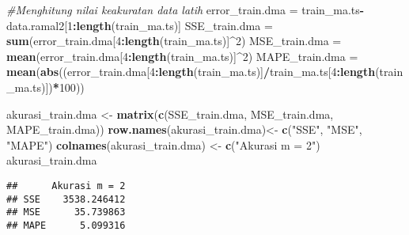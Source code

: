 \documentclass[
]{article}
\newenvironment{Shaded}{\begin{snugshade}}{\end{snugshade}}
\newcommand{\CommentTok}[1]{\textcolor[rgb]{0.56,0.35,0.01}{\textit{#1}}}
\newcommand{\DecValTok}[1]{\textcolor[rgb]{0.00,0.00,0.81}{#1}}
\newcommand{\FunctionTok}[1]{\textcolor[rgb]{0.13,0.29,0.53}{\textbf{#1}}}
\newcommand{\NormalTok}[1]{#1}
\newcommand{\OtherTok}[1]{\textcolor[rgb]{0.56,0.35,0.01}{#1}}
\newcommand{\SpecialCharTok}[1]{\textcolor[rgb]{0.81,0.36,0.00}{\textbf{#1}}}
\newcommand{\StringTok}[1]{\textcolor[rgb]{0.31,0.60,0.02}{#1}}
\begin{document}
\begin{Shaded}
\begin{Highlighting}[]
\CommentTok{\#Menghitung nilai keakuratan data latih}
\NormalTok{error\_train.dma }\OtherTok{=}\NormalTok{ train\_ma.ts}\SpecialCharTok{{-}}\NormalTok{data.ramal2[}\DecValTok{1}\SpecialCharTok{:}\FunctionTok{length}\NormalTok{(train\_ma.ts)]}
\NormalTok{SSE\_train.dma }\OtherTok{=} \FunctionTok{sum}\NormalTok{(error\_train.dma[}\DecValTok{4}\SpecialCharTok{:}\FunctionTok{length}\NormalTok{(train\_ma.ts)]}\SpecialCharTok{\^{}}\DecValTok{2}\NormalTok{)}
\NormalTok{MSE\_train.dma }\OtherTok{=} \FunctionTok{mean}\NormalTok{(error\_train.dma[}\DecValTok{4}\SpecialCharTok{:}\FunctionTok{length}\NormalTok{(train\_ma.ts)]}\SpecialCharTok{\^{}}\DecValTok{2}\NormalTok{)}
\NormalTok{MAPE\_train.dma }\OtherTok{=} \FunctionTok{mean}\NormalTok{(}\FunctionTok{abs}\NormalTok{((error\_train.dma[}\DecValTok{4}\SpecialCharTok{:}\FunctionTok{length}\NormalTok{(train\_ma.ts)]}\SpecialCharTok{/}\NormalTok{train\_ma.ts[}\DecValTok{4}\SpecialCharTok{:}\FunctionTok{length}\NormalTok{(train\_ma.ts)])}\SpecialCharTok{*}\DecValTok{100}\NormalTok{))}

\NormalTok{akurasi\_train.dma }\OtherTok{\textless{}{-}} \FunctionTok{matrix}\NormalTok{(}\FunctionTok{c}\NormalTok{(SSE\_train.dma, MSE\_train.dma, MAPE\_train.dma))}
\FunctionTok{row.names}\NormalTok{(akurasi\_train.dma)}\OtherTok{\textless{}{-}} \FunctionTok{c}\NormalTok{(}\StringTok{"SSE"}\NormalTok{, }\StringTok{"MSE"}\NormalTok{, }\StringTok{"MAPE"}\NormalTok{)}
\FunctionTok{colnames}\NormalTok{(akurasi\_train.dma) }\OtherTok{\textless{}{-}} \FunctionTok{c}\NormalTok{(}\StringTok{"Akurasi m = 2"}\NormalTok{)}
\NormalTok{akurasi\_train.dma}
\end{Highlighting}
\end{Shaded}

\begin{verbatim}
##      Akurasi m = 2
## SSE    3538.246412
## MSE      35.739863
## MAPE      5.099316
\end{verbatim}
\end{document}
